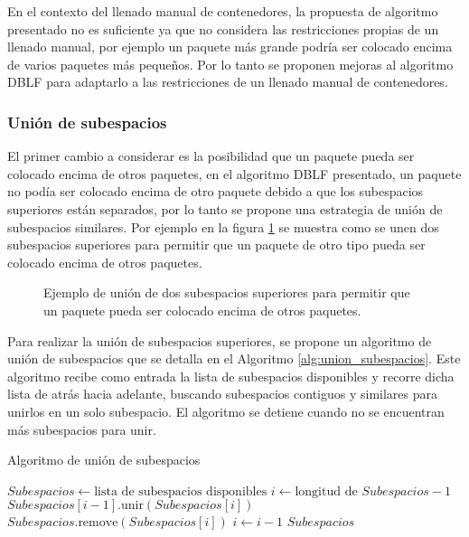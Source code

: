 En el contexto del llenado manual de contenedores, la propuesta de algoritmo presentado no es suficiente ya que no considera las restricciones propias de un llenado manual, por ejemplo un paquete más grande podría ser colocado encima de varios paquetes más pequeños. Por lo tanto se proponen mejoras al algoritmo DBLF para adaptarlo a las restricciones de un llenado manual de contenedores.

\subsubsection{Unión de subespacios}

El primer cambio a considerar es la posibilidad que un paquete pueda ser colocado encima de otros paquetes, en el algoritmo DBLF presentado, un paquete no podía ser colocado encima de otro paquete debido a que los subespacios superiores están separados, por lo tanto se propone una estrategia de unión de subespacios similares. Por ejemplo en la figura \ref{fig:union_subespacios} se muestra como se unen dos subespacios superiores para permitir que un paquete de otro tipo pueda ser colocado encima de otros paquetes.

\begin{figure}[H]
    \centering
    
    \caption{Ejemplo de unión de dos subespacios superiores para permitir que un paquete pueda ser colocado encima de otros paquetes.}
    \label{fig:union_subespacios}
\end{figure}

Para realizar la unión de subespacios superiores, se propone un algoritmo de unión de subespacios que se detalla en el Algoritmo \ref{alg:union_subespacios}. Este algoritmo recibe como entrada la lista de subespacios disponibles y recorre dicha lista de atrás hacia adelante, buscando subespacios contiguos y similares para unirlos en un solo subespacio. El algoritmo se detiene cuando no se encuentran más subespacios para unir.

\begin{algorithm}[H]
    \caption{Algoritmo de unión de subespacios}
    \label{alg:union_subespacios}
    \begin{algorithmic}[1]
        \State $Subespacios \gets \text{lista de subespacios disponibles}$
        \State $i \gets \text{longitud de } Subespacios - 1$
        \State $Subespacios[i-1].\text{unir}(Subespacios[i])$
        \State $Subespacios.\text{remove}(Subespacios[i])$
        \EndIf
        \State $i \gets i - 1$
        \EndWhile
        \State \Return $Subespacios$
    \end{algorithmic}
\end{algorithm}

